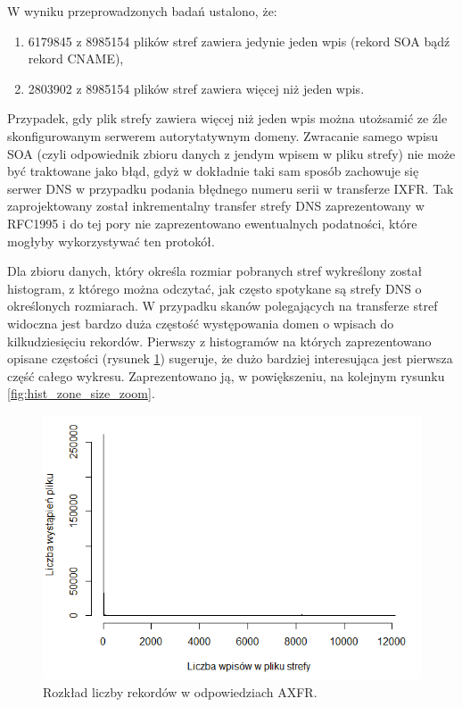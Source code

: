 W wyniku przeprowadzonych badań ustalono, że:
\begin{enumerate}
	\item 6179845 z 8985154 plików stref zawiera jedynie jeden wpis (rekord SOA bądź rekord CNAME),
	\item 2803902 z 8985154 plików stref zawiera więcej niż jeden wpis.
\end{enumerate}
Przypadek, gdy plik strefy zawiera więcej niż jeden wpis można utożsamić ze źle skonfigurowanym serwerem autorytatywnym domeny.
Zwracanie samego wpisu SOA (czyli odpowiednik zbioru danych z jendym wpisem w pliku strefy) nie może być traktowane jako błąd,
gdyż w dokładnie taki sam sposób zachowuje się serwer DNS w przypadku podania błędnego numeru serii w transferze IXFR. Tak
zaprojektowany został inkrementalny transfer strefy DNS zaprezentowany w RFC1995 \cite{RFC1995} i do tej pory nie zaprezentowano
ewentualnych podatności, które mogłyby wykorzystywać ten protokół.

Dla zbioru danych, który określa rozmiar pobranych stref wykreślony został histogram, z którego można odczytać, jak często spotykane
są strefy DNS o określonych rozmiarach. W przypadku skanów polegających na transferze stref widoczna jest bardzo duża częstość
występowania domen o wpisach do kilkudziesięciu rekordów. Pierwszy z histogramów na których zaprezentowano opisane częstości
(rysunek \ref{fig:hist_zone_size}) sugeruje, że dużo bardziej interesująca jest pierwsza część całego wykresu. Zaprezentowano ją,
w powiększeniu, na kolejnym rysunku \ref{fig:hist_zone_size_zoom}.

\begin{figure}[ht]
	\centering
	\includegraphics[width=1.0\textwidth]{image/hist_zone_size_no_title}
	\caption{Rozkład liczby rekordów w odpowiedziach AXFR.}
	\label{fig:hist_zone_size}
\end{figure}

